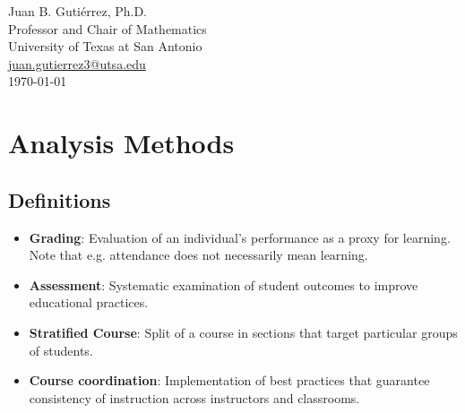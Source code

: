 

\vspace{0.5in}
\noindent Juan B. Guti\'errez, Ph.D. \\
Professor and Chair of Mathematics \\
University of Texas at San Antonio \\
\href{mailto:juan.gutierrez3@utsa.edu}{juan.gutierrez3@utsa.edu} \\
\today


\section{Analysis Methods}
\subsection{Definitions}
\begin{itemize}
	\item \textbf{Grading}: Evaluation of an individual's performance as a proxy for learning. Note that e.g. attendance does not necessarily mean learning. 
	\item \textbf{Assessment}: Systematic examination of student outcomes to improve educational practices.
	\item \textbf{Stratified Course}: Split of a course in sections that target particular groups of students. 
	\item \textbf{Course coordination}: Implementation of best practices that guarantee consistency of instruction across instructors and classrooms.
\end{itemize}

